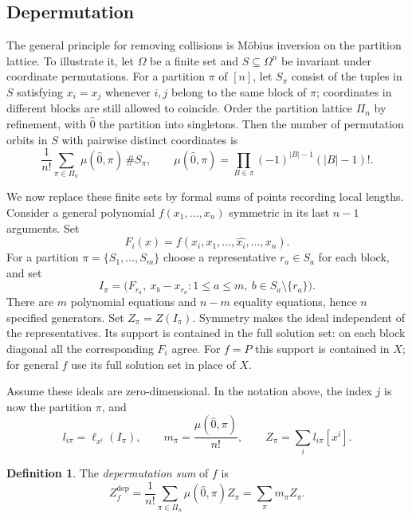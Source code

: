 \documentclass[11pt]{article}
\theoremstyle{definition}
\newtheorem{definition}[proposition]{Definition}
\begin{document}
\subsection{Depermutation}
The general principle for removing collisions is M\"obius inversion on the
partition lattice. To illustrate it, let $\Omega$ be a finite set and
$S\subseteq\Omega^n$ be invariant under coordinate permutations. For a
partition $\pi$ of $[n]$, let $S_\pi$ consist of the tuples in $S$ satisfying
$x_i=x_j$ whenever $i,j$ belong to the same block of $\pi$; coordinates in
different blocks are still allowed to coincide. Order the partition lattice
$\Pi_n$ by refinement, with $\hat0$ the partition into singletons. Then
the number of permutation orbits in $S$ with pairwise distinct
coordinates is
\[
 \frac{1}{n!}\sum_{\pi\in\Pi_n}\mu(\hat0,\pi)\,\#S_\pi,
 \qquad
 \mu(\hat0,\pi)=\prod_{B\in\pi}(-1)^{|B|-1}(|B|-1)!.
\]


We now replace these finite sets by formal sums of points recording local lengths.
Consider a general polynomial $f(x_1,\ldots,x_n)$ symmetric in
its last $n-1$ arguments. Set
\[
 F_i(x)=f(x_i,x_1,\ldots,\widehat{x_i},\ldots,x_n).
\]
For a partition $\pi=\{S_1,\ldots,S_m\}$ choose a representative
$r_a\in S_a$ for each block, and set
\[
 I_\pi=\bigl(F_{r_a},\ x_b-x_{r_a}:
       1\le a\le m,\ b\in S_a\setminus\{r_a\}\bigr).
\]
There are $m$ polynomial equations and $n-m$ equality equations, hence
$n$ specified generators. Set $Z_\pi=Z(I_\pi)$.
Symmetry makes the ideal independent of the representatives. Its support
is contained in the full solution set: on each block diagonal all the
corresponding $F_i$ agree. For $f=P$ this support is contained in $X$;
for general $f$ use its full solution set in place of $X$.

Assume these ideals are zero-dimensional. In the notation above, the index $j$
is now the partition $\pi$, and
\[
 l_{i\pi}=\ell_{x^i}(I_\pi),\qquad
 m_\pi=\frac{\mu(\hat0,\pi)}{n!},\qquad
 Z_\pi=\sum_i l_{i\pi}[x^i].
\]

\begin{definition}
\label{def:depermutation}
The {\em depermutation sum} of $f$ is
\begin{equation}\label{eq:cycle}
 Z^{\mathrm{dep}}_f=\frac{1}{n!}
 \sum_{\pi\in\Pi_n}
 \mu(\hat0,\pi)Z_\pi
 =\sum_\pi m_\pi Z_\pi.
\end{equation}
\end{definition}
\end{document}
